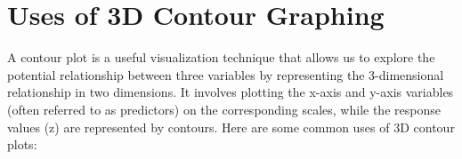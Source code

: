 \documentclass[
11pt, %
a4paper, %
oneside, %
headinclude,footinclude, %
BCOR5mm, %
]{scrartcl}
\begin{document}



\newpage %


\section{Uses of 3D Contour Graphing}
A contour plot is a useful visualization technique that allows us to explore the potential relationship between three variables by representing the 3-dimensional relationship in two dimensions. It involves plotting the x-axis and y-axis variables (often referred to as predictors) on the corresponding scales, while the response values (z) are represented by contours.\cite{Minitab}
\newline
\newline
Here are some common uses of 3D contour plots:
\end{document}
